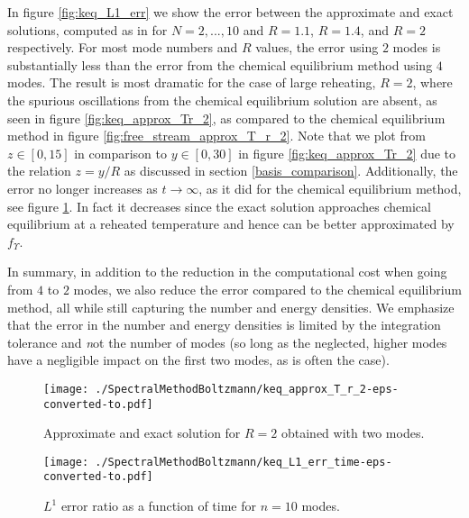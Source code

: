In figure \ref{fig:keq_L1_err} we show the error between the approximate and exact solutions, computed as in  for $N=2,...,10$ and $R=1.1$, $R=1.4$, and $R=2$ respectively.  For most mode numbers and $R$ values, the error using $2$ modes is substantially less than the error from the chemical equilibrium method using $4$ modes.  The result is most dramatic for the case of large reheating, $R=2$, where the spurious oscillations from the chemical equilibrium solution are absent, as seen in figure \ref{fig:keq_approx_Tr_2}, as compared to the chemical equilibrium method in figure \ref{fig:free_stream_approx_T_r_2}.  Note that we plot from $z\in [0,15]$ in comparison to $y\in[0,30]$ in figure \ref{fig:keq_approx_Tr_2} due to the relation $z=y/R$ as discussed in section \ref{basis_comparison}. Additionally, the error no longer increases as $t\rightarrow\infty$, as it did for the chemical equilibrium method, see figure \ref{fig:keq_L1_err_time}.  In fact it decreases since the exact solution approaches chemical equilibrium at a reheated temperature and hence can be better approximated by $f_\Upsilon$. 

In summary, in addition to the reduction in the computational cost when going from $4$ to $2$ modes, we also reduce the error compared to the chemical equilibrium method, all while still capturing the number and energy densities.  We emphasize that the error in the number and energy densities is limited by the integration tolerance and {\emph not} the number of modes (so long as the neglected, higher modes have a negligible impact on the first two modes, as is often the case).  

\begin{figure}[H]
 \begin{minipage}[t]{0.5\linewidth}
\centerline{\texttt{[image: ./SpectralMethodBoltzmann/keq\_approx\_T\_r\_2-eps-converted-to.pdf]}}
\caption{Approximate and exact solution for $R=2$ obtained with two modes.}\label{fig:keq_approx_Tr_2}
 \end{minipage}
 \hspace{0.5cm}
 \begin{minipage}[t]{0.5\linewidth}
\centerline{\texttt{[image: ./SpectralMethodBoltzmann/keq\_L1\_err\_time-eps-converted-to.pdf]}}
\caption{$L^1$ error ratio as a function of time for $n=10$ modes.}\label{fig:keq_L1_err_time}
 \end{minipage}
 \end{figure}


